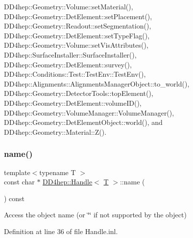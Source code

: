 D\+D4hep\+::\+Geometry\+::\+Volume\+::set\+Material(), D\+D4hep\+::\+Geometry\+::\+Det\+Element\+::set\+Placement(), D\+D4hep\+::\+Geometry\+::\+Readout\+::set\+Segmentation(), D\+D4hep\+::\+Geometry\+::\+Det\+Element\+::set\+Type\+Flag(), D\+D4hep\+::\+Geometry\+::\+Volume\+::set\+Vis\+Attributes(), D\+D4hep\+::\+Surface\+Installer\+::\+Surface\+Installer(), D\+D4hep\+::\+Geometry\+::\+Det\+Element\+::survey(), D\+D4hep\+::\+Conditions\+::\+Test\+::\+Test\+Env\+::\+Test\+Env(), D\+D4hep\+::\+Alignments\+::\+Alignments\+Manager\+Object\+::to\+\_\+world(), D\+D4hep\+::\+Geometry\+::\+Detector\+Tools\+::top\+Element(), D\+D4hep\+::\+Geometry\+::\+Det\+Element\+::volume\+I\+D(), D\+D4hep\+::\+Geometry\+::\+Volume\+Manager\+::\+Volume\+Manager(), D\+D4hep\+::\+Geometry\+::\+Det\+Element\+Object\+::world(), and D\+D4hep\+::\+Geometry\+::\+Material\+::\+Z().

\hypertarget{class_d_d4hep_1_1_handle_a27c7d467a609ab32c133e1f3c7d85ef5}{}\label{class_d_d4hep_1_1_handle_a27c7d467a609ab32c133e1f3c7d85ef5} 
\subsubsection{\texorpdfstring{name()}{name()}\hspace{0.1cm}{\footnotesize\ttfamily [1/2]}}
{\footnotesize\ttfamily template$<$typename T $>$ \\
const char $\ast$ \hyperlink{class_d_d4hep_1_1_handle}{D\+D4hep\+::\+Handle}$<$ \hyperlink{class_t}{T} $>$\+::name (\begin{DoxyParamCaption}{ }\end{DoxyParamCaption}) const}



Access the object name (or \char`\"{}\char`\"{} if not supported by the object) 



Definition at line 36 of file Handle.\+inl.



